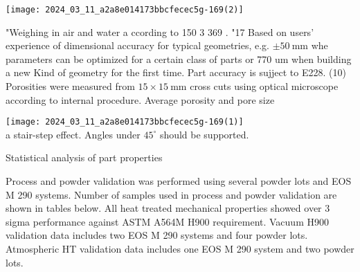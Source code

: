 \documentclass[10pt]{article}
\begin{document}
\begin{center}
\texttt{[image: 2024\_03\_11\_a2a8e014173bbcfecec5g-169(2)]}
\end{center}

"Weighing in air and water a ccording to 150 3 369 . "17 Based on users' experience of dimensional accuracy for typical geometries, e.g. $\pm 50 \mathrm{~mm}$ whe parameters can be optimized for a certain class of parts or 770 um when building a new Kind of geometry for the first time. Part accuracy is sujject to E228. (10) Porosities were measured from $15 \times 15 \mathrm{~mm}$ cross cuts using optical microscope according to internal procedure. Average porosity and pore size

\texttt{[image: 2024\_03\_11\_a2a8e014173bbcfecec5g-169(1)]}\\
a stair-step effect. Angles under $45^{\circ}$ should be supported.

Statistical analysis of part properties

Process and powder validation was performed using several powder lots and EOS M 290 systems. Number of samples used in process and powder validation are shown in tables below. All heat treated mechanical properties showed over 3 sigma performance against ASTM A564M H900 requirement. Vacuum H900 validation data includes two EOS M 290 systems and four powder lots. Atmospheric HT validation data includes one EOS M 290 system and two powder lots.
\end{document}
